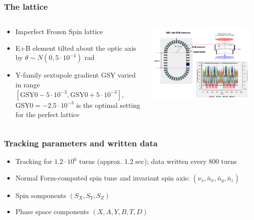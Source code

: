 \documentclass{beamer}
\begin{document}
\begin{frame}\frametitle{The lattice}
  \begin{columns}
    \begin{column}{.5\textwidth}
      \begin{itemize}
      \item Imperfect Frozen Spin lattice
      \item E+B element tilted about the optic axis by $\theta\sim N(0, 5\cdot 10^{-4})$ rad
      \item Y-family sextupole gradient GSY varied in range $[\mathrm{GSY0} - 5\cdot 10^{-3}, \mathrm{GSY0} + 5\cdot 10^{-3}]$, $\mathrm{GSY0}=-2.5\cdot10^{-3}$ is the optimal setting for the perfect lattice
      \end{itemize}
    \end{column}
    \begin{column}{.5\textwidth}
      \begin{center}
        \includegraphics[height=.5\paperheight]{../PhD/img/spin_axis_motion/presentation/lattice}
      \end{center}
    \end{column}
  \end{columns}
\end{frame}

\begin{frame}\frametitle{Tracking parameters and written data}
  \begin{itemize}
  \item Tracking for $1.2\cdot 10^6$ turns (approx. 1.2 sec); data written every 800 turns
  \item Normal Form-computed spin tune and invariant spin axis: $(\nu_s, \bar n_x, \bar n_y, \bar n_z)$
  \item Spin somponents $(S_X, S_Y, S_Z)$
  \item Phase space components $(X, A, Y, B, T, D)$
  \end{itemize}
\end{frame}
\end{document}
